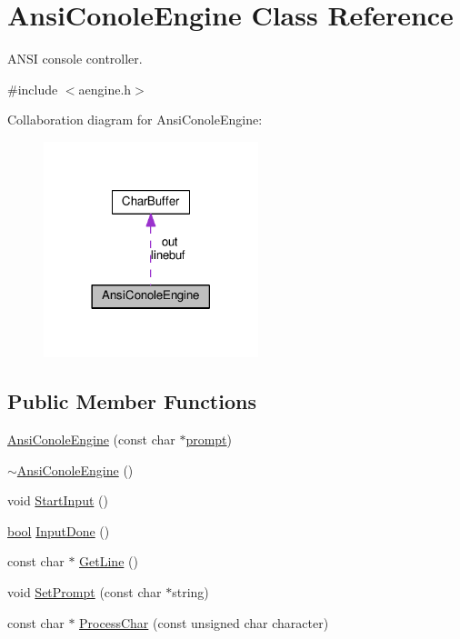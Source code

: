\hypertarget{classAnsiConoleEngine}{}\section{Ansi\+Conole\+Engine Class Reference}
\label{classAnsiConoleEngine}


A\+N\+SI console controller.  




{\ttfamily \#include $<$aengine.\+h$>$}



Collaboration diagram for Ansi\+Conole\+Engine\+:\nopagebreak
\begin{figure}[H]
\begin{center}
\leavevmode
\includegraphics[width=177pt]{classAnsiConoleEngine__coll__graph}
\end{center}
\end{figure}
\subsection*{Public Member Functions}
\begin{DoxyCompactItemize}
\item 
\hyperlink{classAnsiConoleEngine_aac394a191db46deb09a08522bdf72218}{Ansi\+Conole\+Engine} (const char $\ast$\hyperlink{classAnsiConoleEngine_a97ebef63ba0490711ed78733b6a87be5}{prompt})
\item 
\hyperlink{classAnsiConoleEngine_a2023846db9703224facd0c2015528dc3}{$\sim$\+Ansi\+Conole\+Engine} ()
\item 
void \hyperlink{classAnsiConoleEngine_a8ad01a2ddd3ee5182deb4a74f3d2a0c1}{Start\+Input} ()
\item 
\hyperlink{platform_8h_a1062901a7428fdd9c7f180f5e01ea056}{bool} \hyperlink{classAnsiConoleEngine_ab136f725541608d36dedcd8ffa24e820}{Input\+Done} ()
\item 
const char $\ast$ \hyperlink{classAnsiConoleEngine_ae3b0bd4c66cb82f4ff939b45bd6e7446}{Get\+Line} ()
\item 
void \hyperlink{classAnsiConoleEngine_a6c5dd4043aadc0b310f976eb10cbcd9f}{Set\+Prompt} (const char $\ast$string)
\item 
const char $\ast$ \hyperlink{classAnsiConoleEngine_a7bb2dea88ddc5ae76643d2303fcc4bf1}{Process\+Char} (const unsigned char character)
\end{DoxyCompactItemize}
